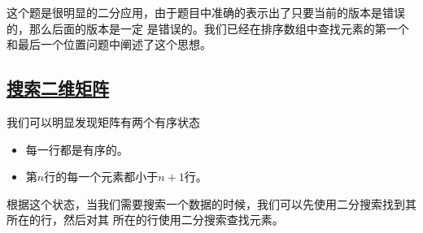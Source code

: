 \documentclass[../../main.tex]{subfiles}
\begin{document}
这个题是很明显的二分应用，由于题目中准确的表示出了只要当前的版本是错误的，那么后面的版本是一定
是错误的。我们已经在排序数组中查找元素的第一个和最后一个位置问题中阐述了这个思想。



\subsection{\href{https://leetcode.cn/problems/search-a-2d-matrix/}{搜索二维矩阵}}

我们可以明显发现矩阵有两个有序状态

\begin{itemize}
  \item 每一行都是有序的。
  \item 第$n$行的每一个元素都小于$n + 1$行。
\end{itemize}

根据这个状态，当我们需要搜索一个数据的时候，我们可以先使用二分搜索找到其所在的行，然后对其
所在的行使用二分搜索查找元素。


\end{document}
